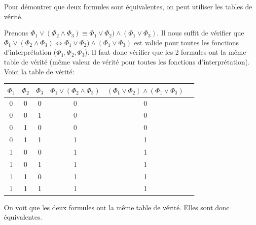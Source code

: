 Pour démontrer que deux formules sont équivalentes, on peut utiliser les tables de vérité. 
\begin{example}\leavevmode
  Prenons $\Phi_1 \vee (\Phi_2 \wedge \Phi_3) \equiv \Phi_1 \vee \Phi_2) \wedge (\Phi_1 \vee \Phi_3)$.
  Il nous suffit de vérifier que $\Phi_1 \vee (\Phi_2 \wedge \Phi_3) \iff \Phi_1 \vee \Phi_2) \wedge (\Phi_1 \vee \Phi_3)$ est valide 
  pour toutes les fonctions d'interprétation ($\Phi_1, \Phi_2, \Phi_3$). 
  Il faut donc vérifier que les 2 formules ont la même table de vérité (même valeur de vérité pour toutes les fonctions d'interprétation).
  Voici la table de vérité: 
  \begin{center}
    \begin{tabular}{|c|c|c|c|c|c|}
      \hline 
      $\Phi_1$ & $\Phi_2$ & $\Phi_3$ & $\Phi_1\vee(\Phi_2\wedge\Phi_3)$ & $(\Phi_1\vee\Phi_2)\wedge(\Phi_1\vee\Phi_3)$ \\ 
      \hline 
      0 & 0 & 0 & 0 & 0 \\ 
      \hline 
      0 & 0 & 1 & 0 & 0 \\ 
      \hline 
      0 & 1 & 0 & 0 & 0 \\ 
      \hline 
      0 & 1 & 1 & 1 & 1 \\ 
      \hline 
      1 & 0 & 0 & 1 & 1 \\ 
      \hline 
      1 & 0 & 1 & 1 & 1 \\ 
      \hline 
      1 & 1 & 0 & 1 & 1 \\ 
      \hline 
      1 & 1 & 1 & 1 & 1 \\ 
      \hline 
    \end{tabular} 
  \end{center} 
  On voit que les deux formules ont la même table de vérité. Elles sont donc équivalentes. 
\end{example}



